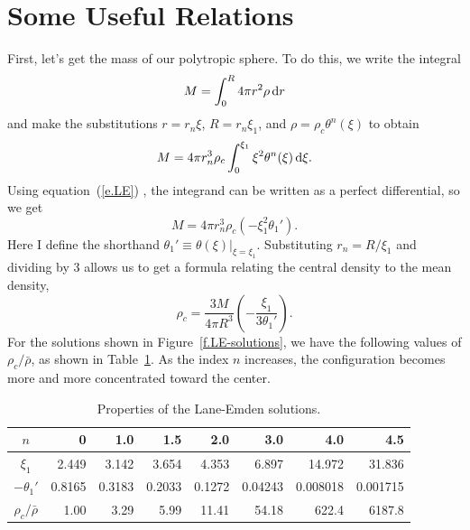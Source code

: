 \section{Some Useful Relations}

First, let's get the mass of our polytropic sphere.  To do this, we write the integral
\[ M = \int_{0}^{R} 4\pi r^{2} \rho\,\mathrm{d} r \]
and make the substitutions $r = r_{n}\xi$, $R = r_{n}\xi_{1}$, and $\rho = \rho_{c}\theta^{n}(\xi)$ to obtain
\[
M = 4\pi r_{n}^{3}\rho_{c}\int_{0}^{\xi_{1}} \xi^{2}\theta^{n}(\xi)\,\mathrm{d}\xi.
\]
Using equation~(\ref{e.LE}) , the integrand can be written as a perfect differential, so we get
\begin{equation}\label{e.LE-mass}
M = 4\pi r_{n}^{3} \rho_{c}\left(-\xi_{1}^{2} \theta_{1}'\right).
\end{equation}
Here I define the shorthand $\theta_{1}' \equiv \theta(\xi)|_{\xi=\xi_{1}}$.  Substituting $r_{n} = R/\xi_{1}$ and dividing by 3 allows us to get a formula relating the central density to the mean density,
\begin{equation}\label{e.LE-density-ratio}
\rho_{c} = \frac{3M}{4\pi R^{3}}\left(-\frac{\xi_{1}}{3\theta_{1}'}\right).
\end{equation}
For the solutions shown in Figure~\ref{f.LE-solutions}, we have the following values of $\rho_{c}/\bar{\rho}$, as shown in Table~\ref{t.LE-properties}.
As the index $n$ increases, the configuration becomes more and more concentrated toward the center.

\begin{table}[htpb]
\caption{Properties of the Lane-Emden solutions.\label{t.LE-properties}}
\begin{tabular}{c|rrrrrrr}
\hline
$n$ & 0 & 1.0 & 1.5 & 2.0 & 3.0 & 4.0 & 4.5 \\
\hline\hline
$\xi_{1}$ & 2.449 & 3.142 & 3.654 & 4.353 & 6.897 & 14.972 & 31.836\\
$-\theta_{1}'$ & 0.8165 & 0.3183 & 0.2033 & 0.1272 & 0.04243 & 0.008018 & 0.001715\\
$\rho_{c}/\bar{\rho}$ & 1.00 & 3.29 & 5.99 & 11.41 & 54.18 & 622.4 & 6187.8\\
\hline
\end{tabular}
\end{table}

